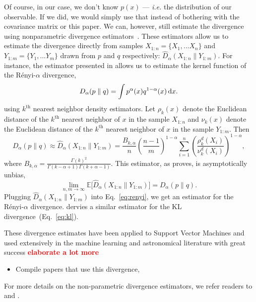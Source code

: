 \documentclass[12pt, letterpaper, preprint]{aastex}
\newcommand{\bitem}{\begin{itemize}}
\newcommand{\eitem}{\end{itemize}}
\newcommand{\beq}{\begin{equation}}
\newcommand{\eeq}{\end{equation}}
\newcommand{\todo}[1]{{\bf \textcolor{red}{#1}}}
\begin{document}
Of course, in our case, we don't know $p(x)$ --- \emph{i.e.} the distribution of
our observable. If we did, we would simply use that instead of bothering with 
the covariance matrix or this paper. We can, however, still estimate the 
divergence using nonparametric divergence estimators~\citep{wang2009, poczos2012, krishnamurthy2014}. 
These estimators allow us to estimate the divergence directly from 
samples $X_{1:n} = \{ X_1, ... X_n \}$ and $Y_{1:m} = \{ Y_1, ... Y_m \}$ 
drawn from $p$ and $q$ respectively: $\hat{D}_{\alpha}(X_{1:n} \parallel Y_{1:m})$. 
For instance, the estimator presented in \cite{poczos2012} allows us to estimate 
the kernel function of the R\'enyi-$\alpha$ divergence,
\beq \label{eq:d_alpha}
D_{\alpha} ( p \parallel q ) = \int p^\alpha(x) q^{1-\alpha}(x)\,{\rm d}x. 
\eeq
using $k^\mathrm{th}$ nearest neighbor density estimators. Let $\rho_k(x)$ 
denote the Euclidean distance of the $k^\mathrm{th}$ nearest neighbor 
of $x$ in the sample $X_{1:n}$ and $\nu_k(x)$ denote the Euclidean distance 
of the $k^\mathrm{th}$ nearest neighbor of $x$ in the sample $Y_{1:m}$. Then 
\beq \label{eq:d_alpha_est}
D_{\alpha}(p \parallel q) \approx \hat{D}_{\alpha}(X_{1:n} \parallel Y_{1:m}) = \frac{B_{k,\alpha}}{n} \left(\frac{n-1}{m}\right)^{1-\alpha}
\sum\limits_{i=1}^{n} \left(\frac{\rho_k^{d}(X_i)}{\nu_k^{d}(X_i)} \right)^{1-\alpha},
\eeq
where $B_{k, \alpha} = \frac{\Gamma(k)^2}{\Gamma(k-\alpha+1)\Gamma(k+\alpha-1)}$. 
This estimator, as \cite{poczos2012} proves, is asymptotically unbias,
\beq
\lim_{n, m \rightarrow \infty} \mathbb{E} \big[ \hat{D}_{\alpha} (X_{1:n} \parallel Y_{1:m}) \big] = D_{\alpha} (p \parallel q).
\eeq
Plugging $\hat{D}_{\alpha}(X_{1:n} \parallel Y_{1:m})$ into Eq.~\ref{eq:renyi},
we get an estimator for the R\'enyi-$\alpha$ divergence. \cite{wang2009} dervies
a similar estimator for the KL divergence~(Eq.~\ref{eq:kl}). 

These divergence estimates have been applied to Support Vector Machines and used 
extensively in the machine learning and astronomical literature with great success 
\todo{elaborate a lot more} 
\bitem 
    \item Compile papers that use this divergence, \cite{ntampaka2015, ntampaka2016}
\eitem
For more details on the non-parametric divergence estimators, we refer readers to 
\cite{poczos2012} and \cite{krishnamurthy2014}.
\end{document}
